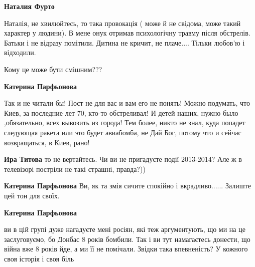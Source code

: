 \begin{itemize}
\begin{itemize}
\begin{itemize}
\textbf{Наталия Фурто}

Наталія, не хвилюйтесь, то така провокація ( може й не свідома, може такий
характер у людини). В мене онук отримав психологічну травму після обстрелів.
Батьки і не відразу помітили. Дитина не кричит, не плаче.... Тільки любов'ю і
відходили.

Кому це може бути смішним???

\textbf{Катерина Парфьонова} 

Так и не читали бы! Пост не для вас и вам его не понять! Можно подумать, что Киев,
за последние лет 70, кто-то обстреливал! И детей наших, нужно было
,обязательно, всех вывозить из города! Тем более, никто не знал, куда попадет
следующая ракета или это будет авиабомба, не Дай Бог, потому что и сейчас
возвращаться, в Киев, рано!

\textbf{Ира Титова} то не вертайтесь.
Чи ви не пригадуєте події 2013-2014?
Але ж в телевізорі постріли не такі страшні, правда?))

\textbf{Катерина Парфьонова} Ви, як та змія сичите спокійно і вкрадливо...... Залиште цей тон для своїх.

\textbf{Катерина Парфьонова} 

ви в цій групі дуже нагадуєте мені росіян, які теж аргументують, що ми на це
заслуговуємо, бо Донбас 8 років бомбили. Так і ви тут намагаєтесь донести, що
війна вже 8 років йде, а ми її не помічали. Звідки така впевненість? У кожного
своя історія і своя біль

\end{itemize} %

\end{itemize} %



\end{itemize}
